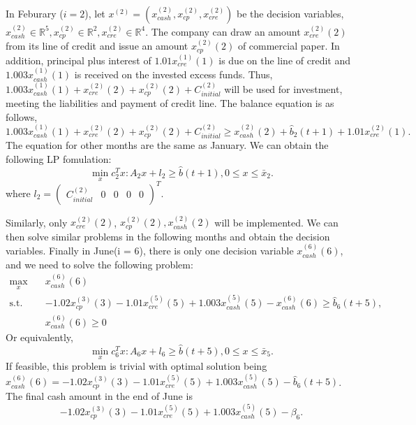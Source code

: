     In Feburary ($i = 2$), let $x^{(2)}=(x^{(2)}_{cash}, x^{(2)}_{cp}, x^{(2)}_{cre})$ be the decision variables, $x^{(2)}_{cash}\in\mathbb{R}^5, x^{(2)}_{cp}\in\mathbb{R}^2, x^{(2)}_{cre}\in\mathbb{R}^4$. The company can draw an amount $x^{(2)}_{cre}(2)$ from its line of credit and issue an amount $x^{(2)}_{cp}(2)$ of commercial paper. In addition, principal plus interest of $1.01x^{(1)}_{cre}(1)$ is due on the line of credit and $1.003x^{(1)}_{cash}(1)$ is received on the invested excess funds. Thus, $1.003x^{(1)}_{cash}(1)+x^{(2)}_{cre}(2)+x^{(2)}_{cp}(2)+C^{(2)}_{initial}$ will be used for investment, meeting the liabilities and payment of credit line. The balance equation is as follows, 
        \[
            1.003x^{(1)}_{cash}(1)+x^{(2)}_{cre}(2)+x^{(2)}_{cp}(2)+C^{(2)}_{initial}\geq x^{(2)}_{cash}(2) + \hat{b}_2(t+1)+1.01x^{(2)}_{cre}(1).
        \]
    The equation for other months are the same as January. We can obtain the following LP fomulation:
    \begin{equation}\label{eq:naiveFeb}
        \min_x c_2^Tx: A_2x+l_2\geq\hat{b}(t+1), 0\leq x\leq \bar{x}_2.
    \end{equation}
    where $l_2 = \begin{pmatrix}C^{(2)}_{initial} & 0& 0& 0& 0\end{pmatrix}^T$.

    Similarly, only $x^{(2)}_{cre}(2)$, $x^{(2)}_{cp}(2), x^{(2)}_{cash}(2)$ will be implemented. We can then solve similar problems in the following months and obtain the decision variables. Finally in June(i = 6), there is only one decision variable $x^{(6)}_{cash}(6)$, and we need to solve the following problem:
    \[
        \begin{split}
            \max_{x} \quad & x^{(6)}_{cash}(6) \\
            \text{s.t.} \quad 
            & - 1.02x^{(3)}_{cp}(3) - 1.01x^{(5)}_{cre}(5) + 1.003x^{(5)}_{cash}(5) - x^{(6)}_{cash}(6) \geq \hat{b}_6(t+5),  \\
            & x^{(6)}_{cash}(6)\geq 0
        \end{split}
    \]
    Or equivalently,
    \begin{equation}\label{eq:naiveJune}
        \min_x c_6^Tx: A_6x+l_6\geq\hat{b}(t+5), 0\leq x\leq \bar{x}_5.
    \end{equation}
    If feasible, this problem is trivial with optimal solution being $x^{(6)}_{cash}(6) = - 1.02x^{(3)}_{cp}(3) - 1.01x^{(5)}_{cre}(5) + 1.003x^{(5)}_{cash}(5) - \hat{b}_6(t+5)$. The final cash amount in the end of June is 
    \[- 1.02x^{(3)}_{cp}(3) - 1.01x^{(5)}_{cre}(5) + 1.003x^{(5)}_{cash}(5) - \beta_6.\]

